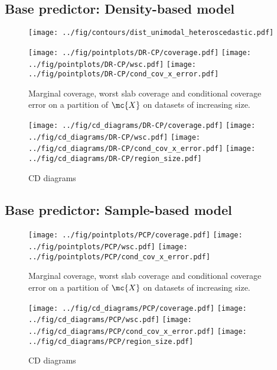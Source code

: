 \subsection{Base predictor: Density-based model}

\begin{figure}[H]
    \centering
    \texttt{[image: ../fig/contours/dist\_unimodal\_heteroscedastic.pdf]}
    \caption{}
\end{figure}

\begin{figure}[H]
    \texttt{[image: ../fig/pointplots/DR-CP/coverage.pdf]}
    \texttt{[image: ../fig/pointplots/DR-CP/wsc.pdf]}
    \texttt{[image: ../fig/pointplots/DR-CP/cond\_cov\_x\_error.pdf]}
    \caption{Marginal coverage, worst slab coverage and conditional coverage error on a partition of $\mc{X}$ on datasets of increasing size.}
\end{figure}

\begin{figure}[H]
    \centering
    \texttt{[image: ../fig/cd\_diagrams/DR-CP/coverage.pdf]}
    \texttt{[image: ../fig/cd\_diagrams/DR-CP/wsc.pdf]}
    \texttt{[image: ../fig/cd\_diagrams/DR-CP/cond\_cov\_x\_error.pdf]}
    \texttt{[image: ../fig/cd\_diagrams/DR-CP/region\_size.pdf]}
    \caption{CD diagrams}
\end{figure}

\subsection{Base predictor: Sample-based model}

\begin{figure}[H]
    \texttt{[image: ../fig/pointplots/PCP/coverage.pdf]}
    \texttt{[image: ../fig/pointplots/PCP/wsc.pdf]}
    \texttt{[image: ../fig/pointplots/PCP/cond\_cov\_x\_error.pdf]}
    \caption{Marginal coverage, worst slab coverage and conditional coverage error on a partition of $\mc{X}$ on datasets of increasing size.}
\end{figure}

\begin{figure}[H]
    \centering
    \texttt{[image: ../fig/cd\_diagrams/PCP/coverage.pdf]}
    \texttt{[image: ../fig/cd\_diagrams/PCP/wsc.pdf]}
    \texttt{[image: ../fig/cd\_diagrams/PCP/cond\_cov\_x\_error.pdf]}
    \texttt{[image: ../fig/cd\_diagrams/PCP/region\_size.pdf]}
    \caption{CD diagrams}
\end{figure}

